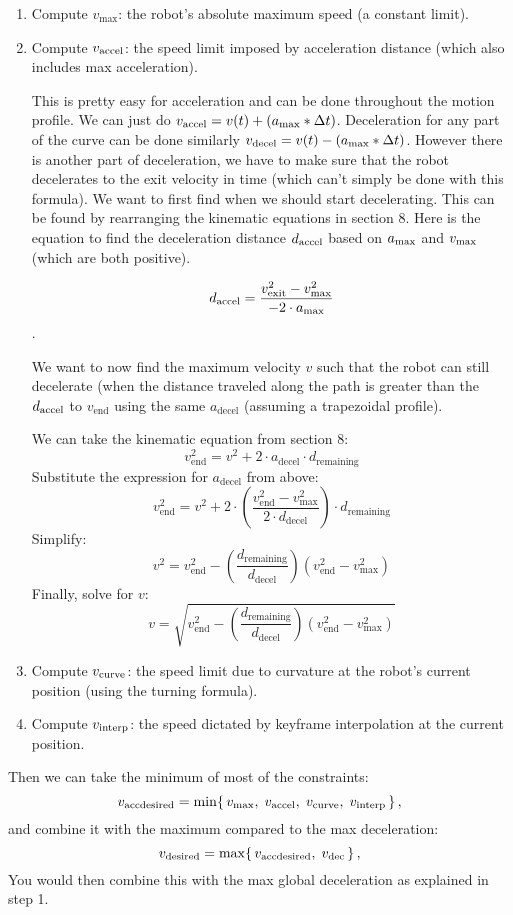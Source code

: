 \documentclass[11pt]{article}
\begin{document}
\begin{enumerate}
  \item Compute \(v_{\max}\): the robot’s absolute maximum speed (a constant limit).


  \item Compute \(v_{\rm accel}\): the speed limit imposed by acceleration distance (which also includes max acceleration).

	This is pretty easy for acceleration and can be done throughout the motion profile. We can just do \(v_{\rm accel} = v(t) + ( a_{\rm max} * \Delta t)\). Deceleration for any part of the curve can be done similarly \(v_{\rm decel} = v(t) - ( a_{\rm max} * \Delta t)\). However there is another part of deceleration, we have to make sure that the robot decelerates to the exit velocity in time (which can't simply be done with this formula). We want to first find when we should start decelerating. This can be found by rearranging the kinematic equations in section 8. Here is the equation to find the deceleration distance \(d_{\rm accel}\) based on \(a_{\rm max}\) and \(v_{\rm max}\) (which are both positive).

\[
	d_{\rm accel} = \frac{v_{\rm exit}^2 - v_{\rm max}^2}{-2 \cdot a_{\rm max}}
\].

We want to now find the maximum velocity \( v \) such that the robot can still decelerate (when the distance traveled along the path is greater than the  \(d_{\rm accel}\) to \( v_{\text{end}} \) using the same \( a_{\text{decel}} \) (assuming a trapezoidal profile).

We can take the kinematic equation from section 8:
\[
v_{\text{end}}^2 = v^2 + 2 \cdot a_{\text{decel}} \cdot d_{\text{remaining}}
\]
Substitute the expression for \( a_{\text{decel}} \) from above:
\[
v_{\text{end}}^2 = v^2 + 2 \cdot \left( \frac{v_{\text{end}}^2 - v_{\text{max}}^2}{2 \cdot d_{\text{decel}}} \right) \cdot d_{\text{remaining}}
\]
Simplify:
\[
v^2 = v_{\text{end}}^2 - \left( \frac{d_{\text{remaining}}}{d_{\text{decel}}} \right) (v_{\text{end}}^2 - v_{\text{max}}^2)
\]
Finally, solve for \( v \):
\[
v = \sqrt{v_{\text{end}}^2 - \left( \frac{d_{\text{remaining}}}{d_{\text{decel}}} \right) (v_{\text{end}}^2 - v_{\text{max}}^2)}
\]
  \item Compute \(v_{\rm curve}\): the speed limit due to curvature at the robot’s current position (using the turning formula).
  \item Compute \(v_{\rm interp}\): the speed dictated by keyframe interpolation at the current position.
\end{enumerate}
Then we can take the minimum of most of the constraints:
\[
v_{\rm acc desired} = \min\{\,v_{\max},\;v_{\rm accel},\;v_{\rm curve},\;v_{\rm interp}\,\}\,,
\] 
and combine it with the maximum compared to the max deceleration:
\[
v_{\rm desired} = \max\{\,v_{\rm acc desired},\;v_{\rm dec}\,\}\,,
\] 
You would then combine this with the max global deceleration as explained in step 1.
\end{document}

